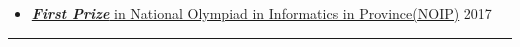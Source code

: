 \documentclass[10pt]{article}
\newenvironment{outerlist}[1][\enskip\textbullet]%
        {%
        \begin{itemize}[label=#1, itemsep=1pt]}{\end{itemize}%
         \vspace{-0.6\baselineskip}}
\begin{document}
\begin{outerlist}
        \item \href{https://concyclics.github.io/resume/certificates/NOIP.jpg}
        {\textbf{\textit{First Prize}} in National Olympiad in Informatics in Province(NOIP)} \hfill 2017


	

\end{outerlist}


\noindent\rule{\textwidth}{1pt}
\end{document}
